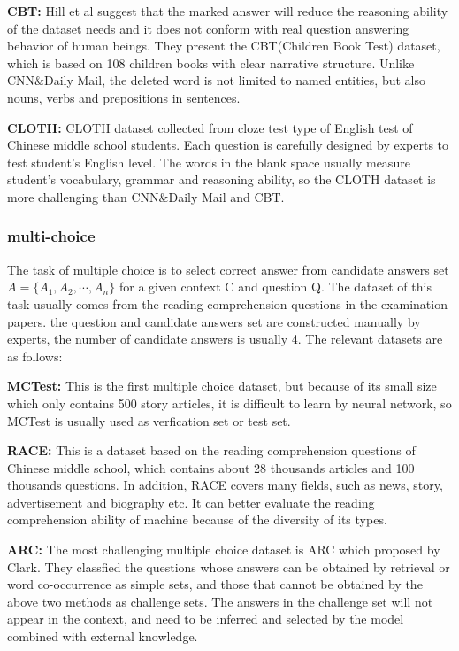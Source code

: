 \documentclass{article}
\begin{document}
\noindent\textbf{CBT: }Hill et al suggest that the marked answer will reduce the reasoning ability of 
the dataset needs and it does not conform with real question answering behavior of human beings. They present the CBT(Children Book Test) dataset, which is 
based on 108 children books with clear narrative structure. Unlike CNN\&Daily Mail, the deleted word is not limited to named entities, but also nouns, verbs and prepositions 
in sentences.

\noindent\textbf{CLOTH: }CLOTH dataset collected from cloze test type of English test of Chinese middle school students. Each question is carefully designed by experts 
to test student's English level. The words in the blank space usually measure student's vocabulary, grammar and reasoning ability, so the CLOTH dataset is more challenging than 
CNN\&Daily Mail and CBT.

\subsubsection{multi-choice}
The task of multiple choice is to select correct answer from candidate answers set $A=\{A_1,A_2,\cdots,A_n\}$ for 
a given context C and question Q. The dataset of this task usually comes from the reading comprehension questions in 
the examination papers. the question and candidate answers set are constructed manually by experts, the number of candidate answers is usually 4. 
The relevant datasets are as follows: 

\noindent\textbf{MCTest: }This is the first multiple choice dataset, but because of its small size which only contains 500 story articles, 
it is difficult to learn by neural network, so MCTest is usually used as verfication set or test set.

\noindent\textbf{RACE: }This is a dataset based on the reading comprehension questions of Chinese middle school, which contains about 28 
thousands articles and 100 thousands questions. In addition, RACE covers many fields, such as news, story, advertisement and biography etc. 
It can better evaluate the reading comprehension ability of machine because of the diversity of its types.

\noindent\textbf{ARC: }The most challenging multiple choice dataset is ARC which proposed by Clark. They classfied the questions whose answers can be 
obtained by retrieval or word co-occurrence as simple sets, and those that cannot be obtained by the above two methods as challenge sets. The answers in the challenge set will not 
appear in the context, and need to be inferred and selected by the model combined with external knowledge.
\end{document}
